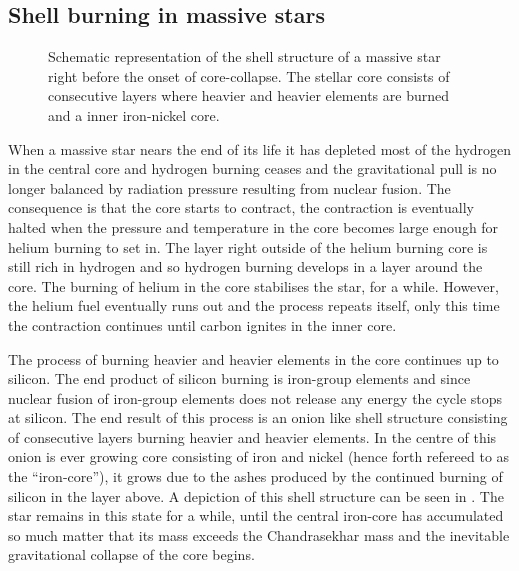 \subsection{Shell burning in massive stars}
\begin{wrapfigure}{r}{0.5\textwidth} \label{figSN:onion}
\caption{Schematic representation of the shell structure of a massive star right before
the onset of core-collapse. The stellar core consists of consecutive layers where heavier
and heavier elements are burned and a inner iron-nickel core.}
\end{wrapfigure}
When a massive star nears the end of its life it has depleted most of the hydrogen in the central core
and hydrogen burning ceases and the gravitational pull is no longer balanced by radiation pressure resulting
from nuclear fusion. The consequence is that the core starts to contract, the contraction is eventually halted when the pressure
and temperature in the core becomes large enough for helium burning to set in. The layer right outside of the helium burning core is still rich
in hydrogen and so hydrogen burning develops in a layer around the core. The burning of helium in the core stabilises the star, for a while.
However, the helium fuel eventually runs out and the process repeats itself, only this time the contraction continues until carbon ignites in the inner core. 

The process of burning heavier and heavier elements in the core continues up to silicon. The end product of silicon burning is iron-group elements and
since nuclear fusion of iron-group elements does not release any energy the cycle stops at silicon. The end result of this process is
an onion like shell structure consisting of consecutive layers burning heavier and heavier elements. In the centre of this onion is ever growing
core consisting of iron and nickel (hence forth refereed to as the ``iron-core''), it grows due to the ashes produced by the continued burning of silicon in the layer above. A depiction of this shell structure can be seen in .
The star remains in this state for a while,
until the central iron-core has accumulated so much matter that its mass exceeds the Chandrasekhar mass and the inevitable gravitational collapse 
of the core begins.


